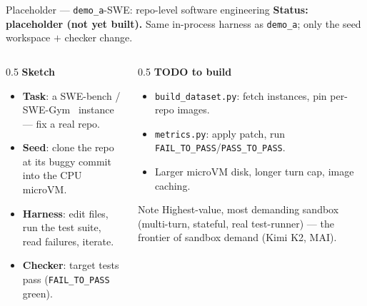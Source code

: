 \documentclass[aspectratio=169]{beamer}
\begin{document}
\begin{frame}{Placeholder --- \texttt{demo\_a}-SWE: repo-level software engineering}
  \footnotesize\textbf{Status: placeholder (not yet built).} Same in-process harness as \texttt{demo\_a};
  only the seed workspace $+$ checker change.
  \begin{columns}[T]
    \begin{column}{0.5\textwidth}
      \textbf{Sketch}
      \begin{itemize}\scriptsize\setlength\itemsep{0.1em}
        \item \textbf{Task}: a SWE-bench / SWE-Gym~\cite{swebench,swegym} instance --- fix a real repo.
        \item \textbf{Seed}: clone the repo at its buggy commit into the CPU microVM.
        \item \textbf{Harness}: edit files, run the test suite, read failures, iterate.
        \item \textbf{Checker}: target tests pass (\texttt{FAIL\_TO\_PASS} green).
      \end{itemize}
    \end{column}
    \begin{column}{0.5\textwidth}
      \textbf{TODO to build}
      \begin{itemize}\scriptsize\setlength\itemsep{0.1em}
        \item \texttt{build\_dataset.py}: fetch instances, pin per-repo images.
        \item \texttt{metrics.py}: apply patch, run \texttt{FAIL\_TO\_PASS}/\texttt{PASS\_TO\_PASS}.
        \item Larger microVM disk, longer turn cap, image caching.
      \end{itemize}
      \begin{block}{Note}
        \scriptsize Highest-value, most demanding sandbox (multi-turn, stateful, real test-runner) ---
        the frontier of sandbox demand (Kimi K2, MAI).
      \end{block}
    \end{column}
  \end{columns}
\end{frame}
\end{document}
